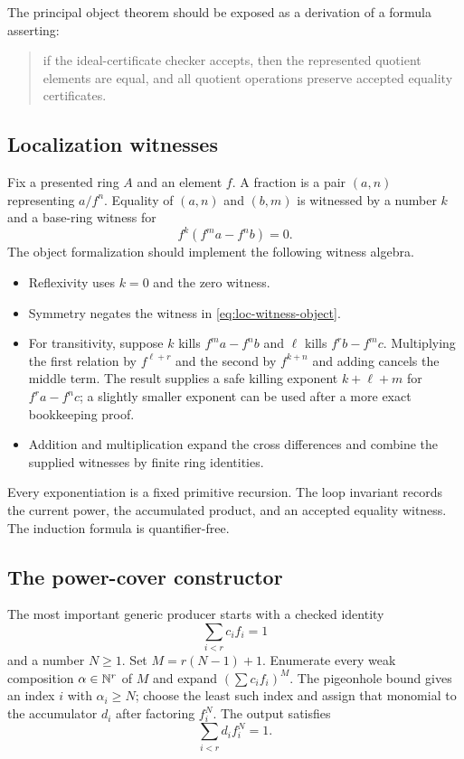 The principal object theorem should be exposed as a derivation of a formula asserting:
\begin{quote}
if the ideal-certificate checker accepts, then the represented quotient elements are equal, and
all quotient operations preserve accepted equality certificates.
\end{quote}

\subsection{Localization witnesses}

Fix a presented ring $A$ and an element $f$.  A fraction is a pair $(a,n)$ representing $a/f^n$.
Equality of $(a,n)$ and $(b,m)$ is witnessed by a number $k$ and a base-ring witness for
\[
                       f^k(f^m a-f^n b)=0.                 \tag{14.1}\label{eq:loc-witness-object}
\]
The object formalization should implement the following witness algebra.

\begin{itemize}
\item Reflexivity uses $k=0$ and the zero witness.
\item Symmetry negates the witness in \eqref{eq:loc-witness-object}.
\item For transitivity, suppose $k$ kills
      $f^m a-f^n b$ and $\ell$ kills $f^r b-f^m c$.  Multiplying the first
      relation by $f^{\ell+r}$ and the second by $f^{k+n}$ and adding cancels
      the middle term.  The result supplies a safe killing exponent
      $k+\ell+m$ for $f^r a-f^n c$; a slightly smaller exponent can be used
      after a more exact bookkeeping proof.
\item Addition and multiplication expand the cross differences and combine the supplied witnesses
      by finite ring identities.
\end{itemize}

Every exponentiation is a fixed primitive recursion.  The loop invariant records the current power,
the accumulated product, and an accepted equality witness.  The induction formula is
quantifier-free.

\subsection{The power-cover constructor}

The most important generic producer starts with a checked identity
\[
                         \sum_{i<r}c_i f_i=1               \tag{14.2}\label{eq:unit-cover-object}
\]
and a number $N\geq1$.  Set $M=r(N-1)+1$.  Enumerate every weak composition
$\alpha\in\mathbb N^r$ of $M$ and expand $(\sum c_i f_i)^M$.  The pigeonhole bound gives an index
$i$ with $\alpha_i\geq N$; choose the least such index and assign that monomial to the accumulator
$d_i$ after factoring $f_i^N$.  The output satisfies
\[
                         \sum_{i<r}d_i f_i^N=1.             \tag{14.3}\label{eq:power-cover-object}
\]

